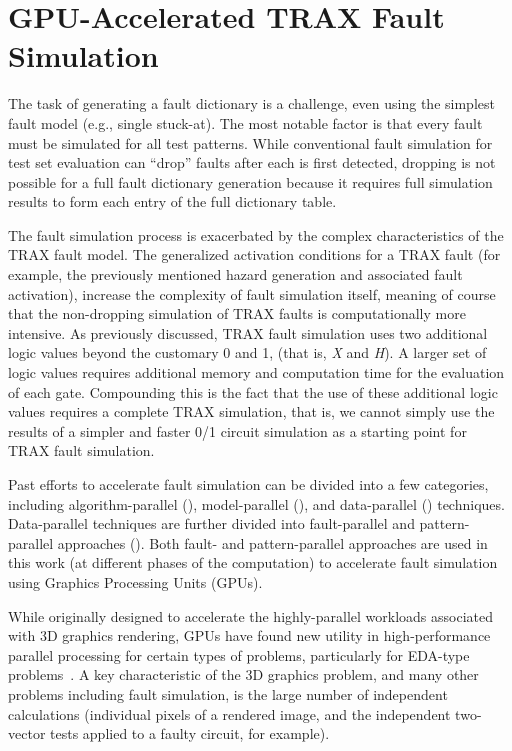\section{GPU-Accelerated TRAX Fault Simulation}
\label{sec:trax_gpu}

The task of generating a fault dictionary is a challenge, even using the simplest fault model (e.g., single stuck-at).
%
The most notable factor is that every fault must be simulated for all test patterns.
%
While conventional fault simulation for test set evaluation can ``drop'' faults after each is first detected, dropping is not possible for a full fault dictionary generation because it requires full simulation results to form each entry of the full dictionary table.

The fault simulation process is exacerbated by the complex characteristics of the TRAX fault model.
%
The generalized activation conditions for a TRAX fault (for example, the previously mentioned hazard generation and associated fault activation), increase the complexity of fault simulation itself, meaning of course that the non-dropping simulation of TRAX faults is computationally more intensive.
%
As previously discussed, TRAX fault simulation uses two additional logic values beyond the customary 0 and 1, (that is, \textit{X} and \textit{H}).
%
A larger set of logic values requires additional memory and computation time for the evaluation of each gate.
%
Compounding this is the fact that the use of these additional logic values requires a complete TRAX simulation, that is, we cannot simply use the results of a simpler and faster 0/1 circuit simulation as a starting point for TRAX fault simulation.

Past efforts to accelerate fault simulation can be divided into a few categories, including algorithm-parallel (\cite{agrawal87, amin97}), model-parallel (\cite{tai93, narayanan92}), and data-parallel (\cite{beece88, ozguner88, pfister82}) techniques.
%
Data-parallel techniques are further divided into fault-parallel and pattern-parallel approaches (\cite{gulati09, parkes95, lee91}).
%
Both fault- and pattern-parallel approaches are used in this work (at different phases of the computation) to accelerate fault simulation using Graphics Processing Units (GPUs).

While originally designed to accelerate the highly-parallel workloads associated with 3D graphics rendering, GPUs have found new utility in high-performance parallel processing for certain types of problems, particularly for EDA-type problems~\cite{croix09}.
%
A key characteristic of the 3D graphics problem, and many other problems including fault simulation, is the large number of independent calculations (individual pixels of a rendered image, and the independent two-vector tests applied to a faulty circuit, for example).

